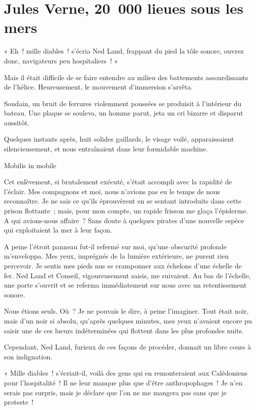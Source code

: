 \documentclass[petitlivre,chapnumsimple]{publivre}
\begin{document}
\chapter{Jules Verne, 20 000 lieues sous les mers}

« Eh ! mille diables ! s’écria Ned Land, frappant du pied la tôle sonore, ouvrez donc, navigateurs peu hospitaliers ! »

Mais il était difficile de se faire entendre au milieu des battements assourdissants de l’hélice. Heureusement, le mouvement d’immersion s’arrêta.

Soudain, un bruit de ferrures violemment poussées se produisit à l’intérieur du bateau. Une plaque se souleva, un homme parut, jeta un cri bizarre et disparut aussitôt.

Quelques instants après, huit solides gaillards, le visage voilé, apparaissaient silencieusement, et nous entraînaient dans leur formidable machine.

\separateurpar

Mobilis in mobile

Cet enlèvement, si brutalement exécuté, s’était accompli avec la rapidité de l’éclair. Mes compagnons et moi, nous n’avions pas eu le temps de nous reconnaître. Je ne sais ce qu’ils éprouvèrent en se sentant introduits dans cette prison flottante ; mais, pour mon compte, un rapide frisson me glaça l’épiderme. A qui avions-nous affaire ? Sans doute à quelques pirates d’une nouvelle espèce qui exploitaient la mer à leur façon.

A peine l’étroit panneau fut-il refermé sur moi, qu’une obscurité profonde m’enveloppa. Mes yeux, imprégnés de la lumière extérieure, ne purent rien percevoir. Je sentis mes pieds nus se cramponner aux échelons d’une échelle de fer. Ned Land et Conseil, vigoureusement saisis, me suivaient. Au bas de l’échelle, une porte s’ouvrit et se referma immédiatement sur nous avec un retentissement sonore.

Nous étions seuls. Où ? Je ne pouvais le dire, à peine l’imaginer. Tout était noir, mais d’un noir si absolu, qu’après quelques minutes, mes yeux n’avaient encore pu saisir une de ces lueurs indéterminées qui flottent dans les plus profondes nuits.

Cependant, Ned Land, furieux de ces façons de procéder, donnait un libre cours à son indignation.

« Mille diables ! s’écriait-il, voilà des gens qui en remonteraient aux Calédoniens pour l’hospitalité ! Il ne leur manque plus que d’être anthropophages ! Je n’en serais pas surpris, mais je déclare que l’on ne me mangera pas sans que je proteste !
\end{document}
